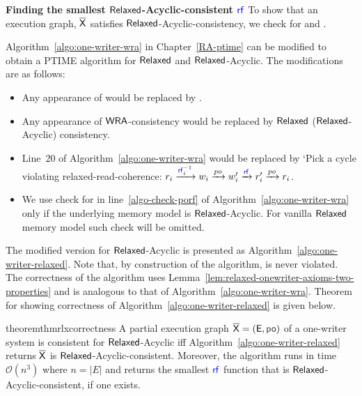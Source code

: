 \textbf{Finding the smallest $\mathsf{Relaxed}$-Acyclic-consistent $\rf$} To show that an execution graph, $\overline{\mathsf{\color{black}X}}$ satisfies $\mathsf{Relaxed}$-Acyclic-consistency, we check for \PORF{} and \RlxRCoh{}. 

Algorithm~\ref{algo:one-writer-wra} in Chapter~\ref{RA-ptime}  can be modified to obtain a PTIME algorithm for $\mathsf{Relaxed}$ and $\mathsf{Relaxed}$-Acyclic. The modifications are as follows:
\begin{itemize}
 \item Any appearance of \WRCoh{} would be replaced  by \RlxRCoh{}.
 
 \item Any appearance of $\mathsf{WRA}$-consistency would be replaced by $\mathsf{Relaxed}$ ($\mathsf{Relaxed}$-Acyclic) consistency.
 
 \item Line~20 of Algorithm~\ref{algo:one-writer-wra} would be replaced by `Pick a cycle violating relaxed-read-coherence: $r_i \xra{\rf_i^{-1}} w_i \xra{po} w'_i \xra{\rf} r'_i \xra{po} r_i$. 
 
 \item We use check for \PORF{} in line~\ref{algo-check-porf} of Algorithm~\ref{algo:one-writer-wra} only if the underlying memory model is $\mathsf{Relaxed}$-Acyclic. For vanilla $\mathsf{Relaxed}$ memory model such check will be omitted.
 \end{itemize}
 
 The modified version for $\mathsf{Relaxed}$-Acyclic is presented as Algorithm~\ref{algo:one-writer-relaxed}. Note that, by construction of the algorithm, \RlxWCoh{} is never violated.  The correctness of the algorithm uses Lemma~\ref{lem:relaxed-onewriter-axioms-two-properties} and is analogous to that of Algorithm~\ref{algo:one-writer-wra}. Theorem for showing correctness of Algorithm~\ref{algo:one-writer-relaxed} is given below.

\begin{restatable}{theorem}{thmrlxcorrectness}\label{th-wra-correctness}
A partial execution graph $\expartial = (\E, \po)$ of a one-writer system is consistent for $\mathsf{Relaxed}$-Acyclic iff  Algorithm~\ref{algo:one-writer-relaxed} returns $\overline{\mathsf{\color{black}X}}$ is $\mathsf{Relaxed}$-Acyclic-consistent. Moreover, the algorithm runs in time $\mathcal{O}(n^3)$ where $n = |E|$  and returns the smallest $\rf$ function that is $\mathsf{Relaxed}$-Acyclic-consistent, if one exists.
\end{restatable}

